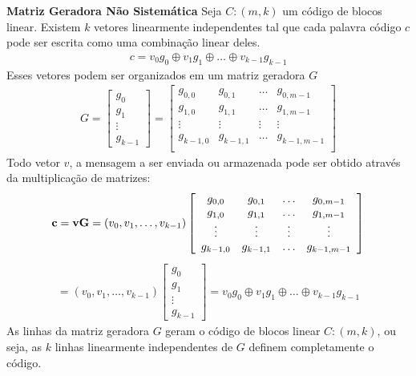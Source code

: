 \begin{definition} {\bf Matriz Geradora Não Sistemática} \label{matger}  Seja $C:(m,k)$ um código de blocos linear. Existem $k$ vetores linearmente independentes tal que cada palavra código $c$ pode ser escrita como uma combinação linear deles.
\begin{align*}
c=v_0g_0 \oplus v_1g_1 \oplus \ldots \oplus v_{k-1}g_{k-1}
\end{align*}
Esses vetores podem ser organizados em um matriz geradora $G$
\begin{align*}
G=\left[\begin{array}{c}
g_0\\
g_1\\
\vdots\\
g_{k-1}
\end{array}\right]=
\left[\begin{array}{cccc}
g_{0,0} & g_{0,1} & \ldots & g_{0,m-1}\\
g_{1,0} & g_{1,1} & \ldots & g_{1,m-1}\\
\vdots & \vdots & \vdots & \vdots\\
g_{k-1,0} & g_{k-1,1} & \ldots & g_{k-1,m-1}\\
\end{array}\right]
\end{align*}
Todo vetor $v$, a mensagem a ser enviada ou armazenada pode ser  obtido através da multiplicação de matrizes:
\begin{align*}
{\bf c} = {\bf vG} = (v_0, v_1, \ldots, v_{k-1})
\left[\begin{array}{cccc}
g_{0,0} & g_{0,1} & \ldots & g_{0,m-1}\\
g_{1,0} & g_{1,1} & \ldots & g_{1,m-1}\\
\vdots & \vdots & \vdots & \vdots\\
g_{k-1,0} & g_{k-1,1} & \ldots & g_{k-1,m-1}\\
\end{array}\right]
\end{align*}
\begin{align*}
= (v_0, v_1, \ldots, v_{k-1})
\left[\begin{array}{c}
g_0\\
g_1\\
\vdots\\
g_{k-1}
\end{array}\right]=v_0g_0 \oplus v_1g_1 \oplus \ldots \oplus v_{k-1}g_{k-1}
\end{align*}
As linhas da matriz geradora $G$ geram o código de blocos linear $C:(m,k)$, ou seja, as $k$ linhas linearmente independentes de $G$ definem completamente o código.
\end{definition}

